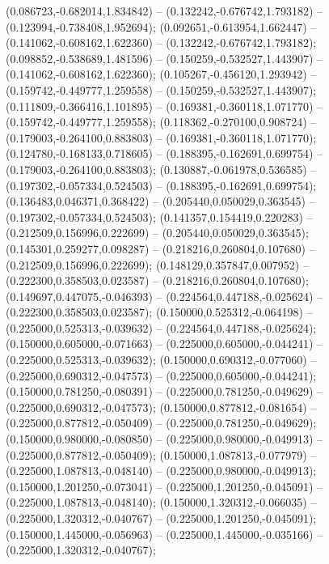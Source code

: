  (0.086723,-0.682014,1.834842) -- (0.132242,-0.676742,1.793182) -- (0.123994,-0.738408,1.952694);
 (0.092651,-0.613954,1.662447) -- (0.141062,-0.608162,1.622360) -- (0.132242,-0.676742,1.793182);
 (0.098852,-0.538689,1.481596) -- (0.150259,-0.532527,1.443907) -- (0.141062,-0.608162,1.622360);
 (0.105267,-0.456120,1.293942) -- (0.159742,-0.449777,1.259558) -- (0.150259,-0.532527,1.443907);
 (0.111809,-0.366416,1.101895) -- (0.169381,-0.360118,1.071770) -- (0.159742,-0.449777,1.259558);
 (0.118362,-0.270100,0.908724) -- (0.179003,-0.264100,0.883803) -- (0.169381,-0.360118,1.071770);
 (0.124780,-0.168133,0.718605) -- (0.188395,-0.162691,0.699754) -- (0.179003,-0.264100,0.883803);
 (0.130887,-0.061978,0.536585) -- (0.197302,-0.057334,0.524503) -- (0.188395,-0.162691,0.699754);
 (0.136483,0.046371,0.368422) -- (0.205440,0.050029,0.363545) -- (0.197302,-0.057334,0.524503);
 (0.141357,0.154419,0.220283) -- (0.212509,0.156996,0.222699) -- (0.205440,0.050029,0.363545);
 (0.145301,0.259277,0.098287) -- (0.218216,0.260804,0.107680) -- (0.212509,0.156996,0.222699);
 (0.148129,0.357847,0.007952) -- (0.222300,0.358503,0.023587) -- (0.218216,0.260804,0.107680);
 (0.149697,0.447075,-0.046393) -- (0.224564,0.447188,-0.025624) -- (0.222300,0.358503,0.023587);
 (0.150000,0.525312,-0.064198) -- (0.225000,0.525313,-0.039632) -- (0.224564,0.447188,-0.025624);
 (0.150000,0.605000,-0.071663) -- (0.225000,0.605000,-0.044241) -- (0.225000,0.525313,-0.039632);
 (0.150000,0.690312,-0.077060) -- (0.225000,0.690312,-0.047573) -- (0.225000,0.605000,-0.044241);
 (0.150000,0.781250,-0.080391) -- (0.225000,0.781250,-0.049629) -- (0.225000,0.690312,-0.047573);
 (0.150000,0.877812,-0.081654) -- (0.225000,0.877812,-0.050409) -- (0.225000,0.781250,-0.049629);
 (0.150000,0.980000,-0.080850) -- (0.225000,0.980000,-0.049913) -- (0.225000,0.877812,-0.050409);
 (0.150000,1.087813,-0.077979) -- (0.225000,1.087813,-0.048140) -- (0.225000,0.980000,-0.049913);
 (0.150000,1.201250,-0.073041) -- (0.225000,1.201250,-0.045091) -- (0.225000,1.087813,-0.048140);
 (0.150000,1.320312,-0.066035) -- (0.225000,1.320312,-0.040767) -- (0.225000,1.201250,-0.045091);
 (0.150000,1.445000,-0.056963) -- (0.225000,1.445000,-0.035166) -- (0.225000,1.320312,-0.040767);
